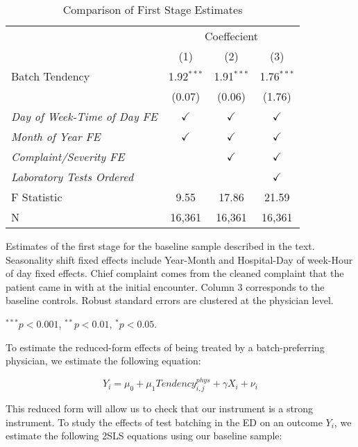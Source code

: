 \documentclass[,mnsc,nonblindrev]{informs}
\begin{document}
\begin{table}[!htbp] \centering 
  \caption{Comparison of First Stage Estimates}
  \label{table:first_stage}
  \begin{tabularx}{5.5in}{Xccc} %
  \toprule
   & \multicolumn{3}{c}{Coeffecient} \\
  \cmidrule{2-4}
   & (1) & (2) & (3) \\
  \midrule
  Batch Tendency & 1.92$^{***}$ & 1.91$^{***}$ & 1.76$^{***}$ \\ 
   & (0.07) & (0.06) & (1.76) \\ 
  \textit{Day of Week-Time of Day FE} & $\checkmark$ & $\checkmark$ & $\checkmark$ \\
  \textit{Month of Year FE} & $\checkmark$ & $\checkmark$ & $\checkmark$ \\
  \textit{Complaint/Severity FE} & & $\checkmark$ & $\checkmark$ \\
  \textit{Laboratory Tests Ordered} & & & $\checkmark$ \\
  \midrule
  F Statistic & 9.55 & 17.86 & 21.59 \\ 
  N & 16,361 & 16,361 & 16,361 \\ 
  \bottomrule
  \end{tabularx}
  \begin{tablenotes}
  \small
  \item Estimates of the first stage for the baseline sample described in the text. Seasonality shift fixed effects include Year-Month and Hospital-Day of week-Hour of day fixed effects. Chief complaint comes from the cleaned complaint that the patient came in with at the initial encounter. Column 3 corresponds to the baseline controls. Robust standard errors are clustered at the physician level.
  \item $^{***} p < 0.001$, $^{**} p < 0.01$, $^{*} p < 0.05$.
  \end{tablenotes}
\end{table}

To estimate the reduced-form effects of being treated by a
batch-preferring physician, we estimate the following equation:

\begin{equation}
Y_i = \mu_0 + \mu_1 Tendency_{i,j}^{phys} + \gamma X_i + \nu_i
\end{equation}

This reduced form will allow us to check that our instrument is a strong
instrument. To study the effects of test batching in the ED on an
outcome \(Y_i\), we estimate the following 2SLS equations using our
baseline sample:
\end{document}
